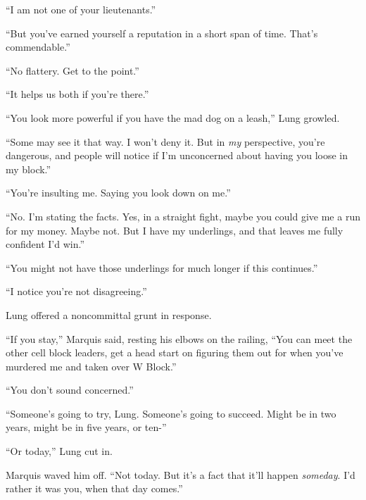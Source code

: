 ``I am not one of your lieutenants.''



``But you've earned yourself a reputation in a short span of time.  That's commendable.''



``No flattery.  Get to the point.''



``It helps us both if you're there.''



``You look more powerful if you have the mad dog on a leash,'' Lung growled.



``Some may see it that way.  I won't deny it.  But in \emph{my} perspective, you're dangerous, and people will notice if I'm unconcerned about having you loose in my block.''



``You're insulting me.  Saying you look down on me.''



``No.  I'm stating the facts.  Yes, in a straight fight, maybe you could give me a run for my money.  Maybe not.  But I have my underlings, and that leaves me fully confident I'd win.''



``You might not have those underlings for much longer if this continues.''



``I notice you're not disagreeing.''



Lung offered a noncommittal grunt in response.



``If you stay,'' Marquis said, resting his elbows on the railing, ``You can meet the other cell block leaders, get a head start on figuring them out for when you've murdered me and taken over W Block.''



``You don't sound concerned.''



``Someone's going to try, Lung.  Someone's going to succeed.  Might be in two years, might be in five years, or ten-''



``Or today,'' Lung cut in.



Marquis waved him off.  ``Not today.  But it's a fact that it'll happen \emph{someday}.  I'd rather it was you, when that day comes.''



